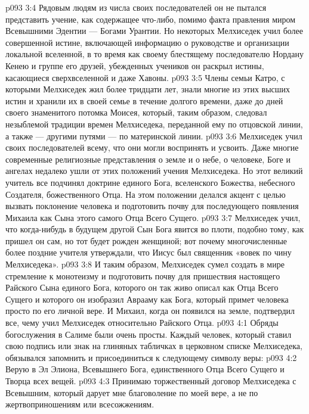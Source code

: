 \vs p093 3:4 Рядовым людям из числа своих последователей он не пытался представить учение, как содержащее что\hyp{}либо, помимо факта правления миром Всевышними Эдентии --- Богами Урантии. Но некоторых Мелхиседек учил более совершенной истине, включающей информацию о руководстве и организации локальной вселенной, в то время как своему блестящему последователю Нордану Кенею и группе его друзей, убежденных учеников он раскрыл истины, касающиеся сверхвселенной и даже Хавоны.
\vs p093 3:5 Члены семьи Катро, с которыми Мелхиседек жил более тридцати лет, знали многие из этих высших истин и хранили их в своей семье в течение долгого времени, даже до дней своего знаменитого потомка Моисея, который, таким образом, следовал незыблемой традиции времен Мелхиседека, переданной ему по отцовской линии, а также --- другими путями --- по материнской линии.
\vs p093 3:6 Мелхиседек учил своих последователей всему, что они могли воспринять и усвоить. Даже многие современные религиозные представления о земле и о небе, о человеке, Боге и ангелах недалеко ушли от этих положений учения Мелхиседека. Но этот великий учитель все подчинял доктрине единого Бога, вселенского Божества, небесного Создателя, божественного Отца. На этом положении делался акцент с целью вызвать поклонение человека и подготовить почву для последующего появления Михаила как Сына этого самого Отца Всего Сущего.
\vs p093 3:7 Мелхиседек учил, что когда\hyp{}нибудь в будущем другой Сын Бога явится во плоти, подобно тому, как пришел он сам, но тот будет рожден женщиной; вот почему многочисленные более поздние учителя утверждали, что Иисус был священник «вовек по чину Мелхиседека».
\vs p093 3:8 И таким образом, Мелхиседек сумел создать в мире стремление к монотеизму и подготовить почву для пришествия настоящего Райского Сына единого Бога, которого он так живо описал как Отца Всего Сущего и которого он изобразил Аврааму как Бога, который примет человека просто по его личной вере. И Михаил, когда он появился на земле, подтвердил все, чему учил Мелхиседек относительно Райского Отца.
\vs p093 4:1 Обряды богослужения в Салиме были очень просты. Каждый человек, который ставил свою подпись или знак на глиняных табличках в церковном списке Мелхиседека, обязывался запомнить и присоединиться к следующему символу веры:
\vs p093 4:2 \bibnobreakspace Верую в Эл Элиона, Всевышнего Бога, единственного Отца Всего Сущего и Творца всех вещей.
\vs p093 4:3 \bibnobreakspace Принимаю торжественный договор Мелхиседека с Всевышним, который дарует мне благоволение по моей вере, а не по жертвоприношениям или всесожжениям.
